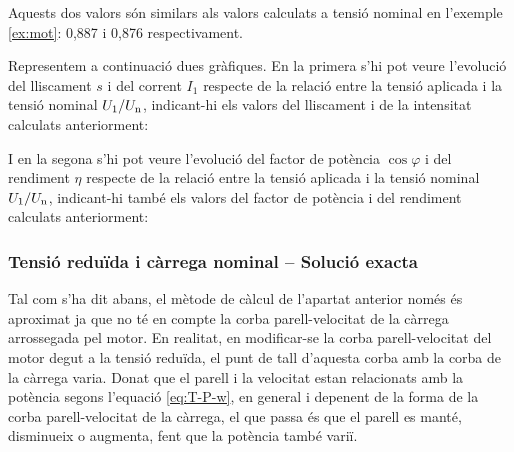 \begin{exemple}
	Aquests dos valors són similars als valors calculats a tensió nominal en  l'exemple \ref{ex:mot}: 0,887 i 0,876 respectivament.
	
	Representem a continuació dues gràfiques. En la primera s'hi pot veure  l'evolució del lliscament $s$ i del corrent $I_1$ respecte de la relació entre la tensió aplicada i la tensió nominal $U_1/U_\mathrm{n}$, indicant-hi els valors del lliscament i de la intensitat calculats anteriorment:
	\begin{center}
		
	\end{center}

	I en la segona s'hi pot veure l'evolució del factor de potència $\cos\varphi$ i del rendiment $\eta$ respecte de la relació entre la tensió aplicada i la tensió nominal $U_1/U_\mathrm{n}$, indicant-hi també  els valors del factor de potència i del rendiment calculats anteriorment:
	\begin{center}
		
	\end{center}	
\end{exemple}

\subsubsection{Tensió reduïda i càrrega nominal -- Solució exacta}

Tal com s'ha dit abans, el mètode de càlcul de l'apartat anterior només és aproximat ja que no té en compte la corba parell-velocitat de la càrrega arrossegada pel motor. En realitat, en modificar-se la corba parell-velocitat del motor degut a la tensió reduïda, el punt de tall d'aquesta corba amb la corba de la càrrega varia. Donat que el parell i la velocitat estan relacionats amb la potència segons l'equació  \eqref{eq:T-P-w}, en general i depenent de la forma de la corba parell-velocitat de la càrrega, el que passa és que el parell es manté,  disminueix o augmenta, fent que la potència també variï.

